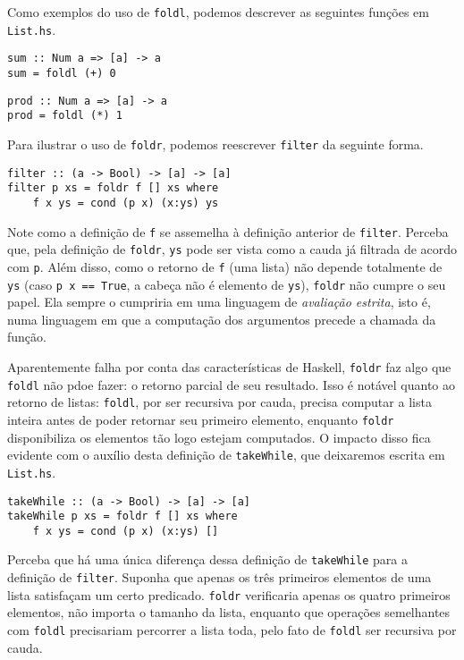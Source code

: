 \documentclass[a4paper]{article}
\begin{document}
Como exemplos do uso de \texttt{foldl}, podemos descrever as seguintes funções em \texttt{List.hs}.

\begin{verbatim}
sum :: Num a => [a] -> a
sum = foldl (+) 0 
\end{verbatim}

\begin{verbatim}
prod :: Num a => [a] -> a
prod = foldl (*) 1 
\end{verbatim}

Para ilustrar o uso de \texttt{foldr}, podemos reescrever \texttt{filter} da seguinte forma.

\begin{verbatim}
filter :: (a -> Bool) -> [a] -> [a]
filter p xs = foldr f [] xs where
	f x ys = cond (p x) (x:ys) ys
\end{verbatim}

Note como a definição de \texttt{f} se assemelha à definição anterior de \texttt{filter}.
Perceba que, pela definição de \texttt{foldr}, \texttt{ys} pode ser vista como a cauda já filtrada de acordo com \texttt{p}.
Além disso, como o retorno de \texttt{f} (uma lista) não depende totalmente de \texttt{ys} (caso \texttt{p x == True}, a cabeça não é elemento de \texttt{ys}), \texttt{foldr} não cumpre o seu papel.
Ela sempre o cumpriria em uma linguagem de \emph{avaliação estrita}, isto é, numa linguagem em que a computação dos argumentos precede a chamada da função.

Aparentemente falha por conta das características de Haskell, \texttt{foldr} faz algo que \texttt{foldl} não pdoe fazer: o retorno parcial de seu resultado.
Isso é notável quanto ao retorno de listas: \texttt{foldl}, por ser recursiva por cauda, precisa computar a lista inteira antes de poder retornar seu primeiro elemento, enquanto \texttt{foldr} disponibiliza os elementos tão logo estejam computados.
O impacto disso fica evidente com o auxílio desta definição de \texttt{takeWhile}, que deixaremos escrita em \texttt{List.hs}.

\begin{verbatim}
takeWhile :: (a -> Bool) -> [a] -> [a]
takeWhile p xs = foldr f [] xs where
	f x ys = cond (p x) (x:ys) []
\end{verbatim}

Perceba que há uma única diferença dessa definição de \texttt{takeWhile} para a definição de \texttt{filter}.
Suponha que apenas os três primeiros elementos de uma lista satisfaçam um certo predicado.
\texttt{foldr} verificaria apenas os quatro primeiros elementos, não importa o tamanho da lista, enquanto que operações semelhantes com \texttt{foldl} precisariam percorrer a lista toda, pelo fato de \texttt{foldl} ser recursiva por cauda.
\end{document}

